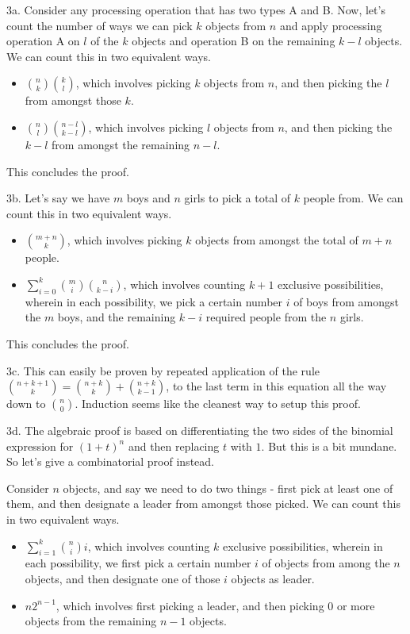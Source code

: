 \documentclass{article}
\begin{document}
3a. Consider any processing operation that has two types A and B. Now, let's count the number of ways we can pick $k$ objects from $n$ and apply processing operation A on $l$ of the $k$ objects and operation B on the remaining $k - l$ objects. We can count this in two equivalent ways.

\begin{itemize}
    \item ${n \choose k}{k \choose l}$, which involves picking $k$ objects from $n$, and then picking the $l$ from amongst those $k$.
    \item ${n \choose l}{n - l \choose k - l}$, which involves picking $l$ objects from $n$, and then picking the $k - l$ from amongst the remaining $n - l$.
\end{itemize}

This concludes the proof.

3b. Let's say we have $m$ boys and $n$ girls to pick a total of $k$ people from. We can count this in two equivalent ways.

\begin{itemize}
    \item ${m + n \choose k}$, which involves picking $k$ objects from amongst the total of $m + n$ people.
    \item $\sum_{i=0}^k {m \choose i}{n \choose k - i}$, which involves counting $k + 1$ exclusive possibilities, wherein in each possibility, we pick a certain number $i$ of boys from amongst the $m$ boys, and the remaining $k - i$ required people from the $n$ girls.
\end{itemize}

This concludes the proof.

3c. This can easily be proven by repeated application of the rule ${n + k + 1 \choose k} = {n + k \choose k} + {n + k \choose k - 1}$, to the last term in this equation all the way down to ${n \choose 0}$. Induction seems like the cleanest way to setup this proof.

3d. The algebraic proof is based on differentiating the two sides of the binomial expression for $(1 + t)^n$ and then replacing $t$ with $1$. But this is a bit mundane. So let's give a combinatorial proof instead.

Consider $n$ objects, and say we need to do two things - first pick at least one of them, and then designate a leader from amongst those picked. We can count this in two equivalent ways.

\begin{itemize}
    \item $\sum_{i=1}^k {n \choose i} i$, which involves counting $k$ exclusive possibilities, wherein in each possibility, we first pick a certain number $i$ of objects from among the $n$ objects, and then designate one of those $i$ objects as leader.
    \item $n2^{n - 1}$, which involves first picking a leader, and then picking $0$ or more objects from the remaining $n - 1$ objects. 
\end{itemize}
\end{document}
